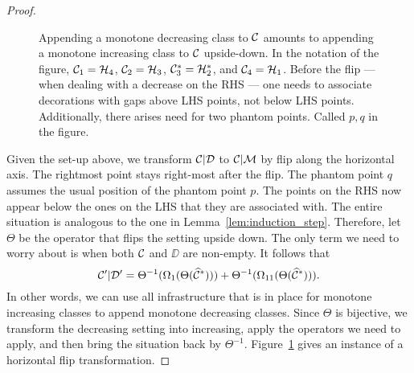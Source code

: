 \documentclass[12pt, a4paper, twoside]{report}
\begin{document}
\begin{proof}
\begin{figure}[!ht]
\caption{Appending a monotone decreasing class to $\mathcal{C}$ amounts to appending a monotone increasing class to $\mathcal{C}$ upside-down. In the notation of the figure, $\mathcal{C}_1= \mathcal{H}_4$, $\mathcal{C}_2 =\mathcal{H}_3$, $\mathcal{C}^*_3 = \mathcal{H}^*_2$, and $\mathcal{C}_4 = \mathcal{H}_1$. Before the flip --- when dealing with a decrease on the RHS --- one needs to associate decorations with gaps above LHS points, not below LHS points. Additionally, there arises need for two phantom points. Called $p,q$ in the figure.}
\label{fig:horizontal_flip}
\end{figure}

Given the set-up above, we transform $\mathcal{C}|\mathcal{D}$ to $\mathcal{C}|\mathcal{M}$ by flip along the horizontal axis. The rightmost point stays right-most after the flip. The phantom point $q$ assumes the usual position of the phantom point $p$. The points on the RHS now appear below the ones on the LHS that they are associated with. The entire situation is analogous to the one in Lemma~\ref{lem:induction_step}. Therefore, let $\Theta$ be the operator that flips the setting upside down. The only term we need to worry about is when both $\mathcal{C}$ and $\DD$ are non-empty. It follows that
$$\mathcal{C}'|\mathcal{D}' = \Theta^{-1}(\Omega_1(\Theta(\widehat{\mathcal{C}}^*))) + \Theta^{-1}(\Omega_{11}(\Theta(\widehat{\mathcal{C}}^*))).$$ 
In other words, we can use all infrastructure that is in place for monotone increasing classes to append monotone decreasing classes. Since $\Theta$ is bijective, we transform the decreasing setting into increasing, apply the operators we need to apply, and then bring the situation back by $\Theta^{-1}$. Figure~\ref{fig:horizontal_flip} gives an instance of a horizontal flip transformation.
\end{proof}
\end{document}
